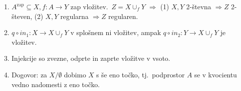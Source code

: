 \documentclass[10pt,a4paper]{article}
\begin{document}
\begin{enumerate}
\item $A^{\text{zap}} \subseteq X, f: A \rightarrow Y$ zap vložitev.~$Z = X \cup_f Y$
    $\Rightarrow$ (1) $X, Y$ 2-števna $\Rightarrow Z$ 2-števen,
    (2) $X, Y$ regularna $\Rightarrow Z$ regularen.
    
\item $q \circ in_1: X \rightarrow X \cup_f Y$ v splošnem ni vložitev, ampak $q \circ in_2: Y \rightarrow X \cup_f Y$ je vložitev.
    
\item Injekcije so zvezne, odprte in zaprte vložitve v vsoto.
    
\item Dogovor: za $X / \emptyset$ dobimo $X$ s še eno točko, tj.~podprostor $A$
    se v kvocientu vedno nadomesti z eno točko.

\vspace{-3mm}
\noindent\makebox[\linewidth]{\rule{\paperwidth}{0.4pt}} 
\vspace{-5mm}

\end{enumerate}
\end{document}
